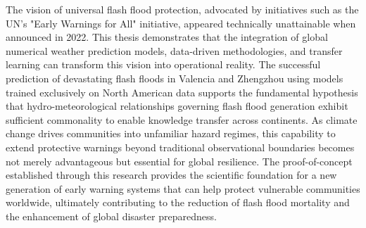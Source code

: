 The vision of universal flash flood protection, advocated by initiatives such as the UN's "Early Warnings for All" initiative, appeared technically unattainable when announced in 2022. This thesis demonstrates that the integration of global numerical weather prediction models, data-driven methodologies, and transfer learning can transform this vision into operational reality. The successful prediction of devastating flash floods in Valencia and Zhengzhou using models trained exclusively on North American data supports the fundamental hypothesis that hydro-meteorological relationships governing flash flood generation exhibit sufficient commonality to enable knowledge transfer across continents. As climate change drives communities into unfamiliar hazard regimes, this capability to extend protective warnings beyond traditional observational boundaries becomes not merely advantageous but essential for global resilience. The proof-of-concept established through this research provides the scientific foundation for a new generation of early warning systems that can help protect vulnerable communities worldwide, ultimately contributing to the reduction of flash flood mortality and the enhancement of global disaster preparedness.